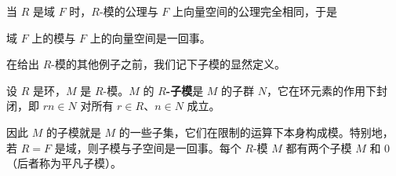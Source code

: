当 \(R\) 是域 \(F\) 时，\(R\)-模的公理与 \(F\) 上向量空间的公理完全相同，于是

\begin{center}
域 \(F\) 上的模与 \(F\) 上的向量空间是一回事。
\end{center}

在给出 \(R\)-模的其他例子之前，我们记下子模的显然定义。

\begin{definition}
设 \(R\) 是环，\(M\) 是 \(R\)-模。\(M\) 的 \textbf{\(R\)-子模}是 \(M\) 的子群 \(N\)，它在环元素的作用下封闭，即 \(rn \in N\) 对所有 \(r \in R\)、\(n \in N\) 成立。
\end{definition}

因此 \(M\) 的子模就是 \(M\) 的一些子集，它们在限制的运算下本身构成模。特别地，若 \(R = F\) 是域，则子模与子空间是一回事。每个 \(R\)-模 \(M\) 都有两个子模 \(M\) 和 0（后者称为平凡子模）。

